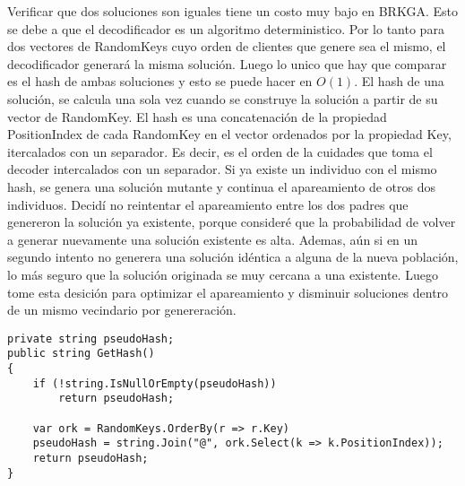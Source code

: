 \bigskip

Verificar que dos soluciones son iguales tiene un costo muy bajo en BRKGA. Esto se debe a que el decodificador es un algoritmo deterministico. Por lo tanto para dos vectores de RandomKeys cuyo orden de clientes que genere sea el mismo, el decodificador generará la misma solución. Luego lo unico que hay que comparar es el hash de ambas soluciones y esto se puede hacer en $O(1)$. El hash de una solución, se calcula una sola vez cuando se construye la solución a partir de su vector de RandomKey. El hash es una concatenación de la propiedad PositionIndex de cada RandomKey en el vector ordenados por la propiedad Key, itercalados con un separador. Es decir, es el orden de la cuidades que toma el decoder intercalados con un separador. Si ya existe un individuo con el mismo hash, se genera una solución mutante y continua el apareamiento de otros dos individuos. Decidí no reintentar el apareamiento entre los dos padres que genereron la solución ya existente, porque consideré que la probabilidad de volver a generar nuevamente una solución existente es alta. Ademas, aún si en un segundo intento no generera una solución idéntica a alguna de la nueva población, lo más seguro que la solución originada se muy cercana a una existente. Luego tome esta desición para optimizar el apareamiento y disminuir soluciones dentro de un mismo vecindario por genereración.

\bigskip

\begin{minipage}{\textwidth}
\begin{lstlisting}
private string pseudoHash;
public string GetHash()
{
	if (!string.IsNullOrEmpty(pseudoHash))
		return pseudoHash;
		
	var ork = RandomKeys.OrderBy(r => r.Key)
	pseudoHash = string.Join("@", ork.Select(k => k.PositionIndex));
	return pseudoHash;
}
\end{lstlisting}
\end{minipage}

\bigskip

